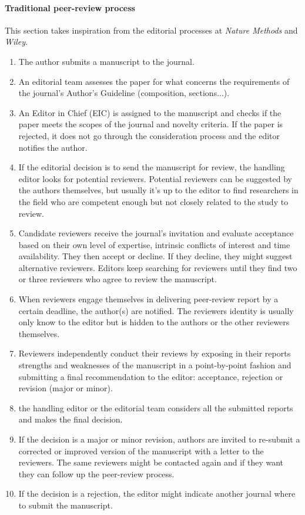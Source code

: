 \documentclass[runningheads]{llncs}
\begin{document}
\paragraph{Traditional peer-review process} This section takes inspiration from the editorial processes at \emph{Nature Methods} and \emph{Wiley}.
\begin{enumerate}
    \item The author submits a manuscript to the journal.
    \item  An editorial team  assesses the paper for what concerns the requirements of the journal's Author's Guideline (composition, sections...).
    \item An Editor in Chief (EIC) is assigned to the manuscript and checks if the paper meets the scopes of the journal and novelty criteria. If the paper is rejected, it does not go through the consideration process and the editor notifies the author.
    \item If the editorial decision is to send the manuscript for review, the handling editor looks for potential reviewers. Potential reviewers can be suggested by the authors themselves, but usually it's up to the editor to find researchers in the field who are competent enough but not closely related to the study to review.
    \item Candidate reviewers receive the journal's invitation and evaluate acceptance based on their own level of expertise, intrinsic conﬂicts of interest and time availability. They then accept or decline. If they decline, they might suggest alternative reviewers. Editors keep searching for reviewers until they find two or three reviewers who agree to review the manuscript.
    \item When reviewers engage themselves in delivering peer-review report by a certain deadline, the author(s) are notified. The reviewers identity is usually only know to the editor but is hidden to the authors or the other reviewers themselves.
    \item Reviewers independently conduct their reviews by exposing in their reports strengths and weaknesses of the manuscript in a point-by-point fashion and submitting a final recommendation to the editor: acceptance, rejection or revision (major or minor).
    \item the handling editor or the editorial team considers all the submitted reports and makes the final decision.
    \item If the decision is a major or minor revision, authors are invited to re-submit a corrected or improved version of the manuscript with a letter to the reviewers. The same reviewers might be contacted again and if they want they can follow up the peer-review process.
    \item If the decision is a rejection, the editor might indicate another journal where to submit the manuscript.

\end{enumerate}
\end{document}
